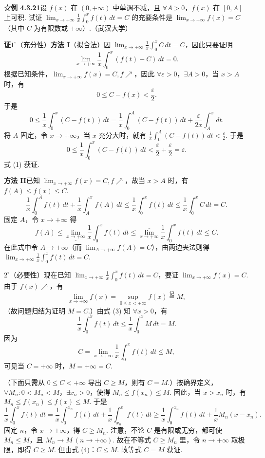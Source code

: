 \documentclass[UTF8, 12pt, fontset=fandol, oneside]{ctexart}
\begin{document}
\noindent\textbf{☆例 4.3.21}\quad 设 $f(x)$ 在 $(0,+\infty)$ 中单调不减，且 $\forall A>0$，$f(x)$ 在 $[0,A]$ 上可积. 试证 $\lim_{x\to+\infty}\frac1x\int_0^x f(t)\,dt=C$ 的充要条件是 $\lim_{x\to+\infty}f(x)=C$（其中 $C$ 为有限数或 $+\infty$）.（武汉大学）

\noindent\textbf{证}\quad $1^\circ$（充分性）\textbf{方法 I}（拟合法）\quad 因 $\lim_{x\to+\infty}\frac1x\int_0^x C\,dt=C$，因此只要证明
\[
\lim_{x\to+\infty}\frac1x\int_0^x(f(t)-C)\,dt=0.
\tag{1}
\]
根据已知条件，$\lim_{x\to+\infty}f(x)=C,f\nearrow$，因此 $\forall\varepsilon>0$，$\exists A>0$，当 $x>A$ 时，有
\[
0\le C-f(x)<\frac{\varepsilon}{2}.
\]
于是
\[
0\le\frac1x\int_0^x(C-f(t))\,dt
=\frac1x\int_0^A(C-f(t))\,dt+\frac{\varepsilon}{2x}\int_A^x dt.
\]
将 $A$ 固定，令 $x\to+\infty$，当 $x$ 充分大时，就有 $\frac1x\int_0^A(C-f(t))\,dt<\frac{\varepsilon}{2}$. 于是
\[
0\le\frac1x\int_0^x(C-f(t))\,dt
<\frac{\varepsilon}{2}+\frac{\varepsilon}{2}=\varepsilon.
\]
式 (1) 获证.

\noindent\textbf{方法 II}\quad 已知 $\lim_{x\to+\infty}f(x)=C,f\nearrow$，故当 $x>A$ 时，有 $f(A)\le f(x)\le C$.
\[
\frac1x\int_0^A f(t)\,dt+\frac1x\int_A^x f(A)\,dt
\le\frac1x\int_0^x f(t)\,dt
\le\frac1x\int_0^x C\,dt=C.
\tag{2}
\]
固定 $A$，令 $x\to+\infty$ 得
\[
f(A)\le\underline{\lim_{x\to+\infty}}\frac1x\int_0^x f(t)\,dt
\le\overline{\lim_{x\to+\infty}}\frac1x\int_0^x f(t)\,dt
\le C.
\]
在此式中令 $A\to+\infty$（而 $\lim_{A\to+\infty}f(A)=C$），由两边夹法则得 $\lim_{x\to+\infty}\frac1x\int_0^x f(t)\,dt=C$.

\noindent $2^\circ$（必要性）现在已知 $\lim_{x\to+\infty}\frac1x\int_0^x f(t)\,dt=C$，要证 $\lim_{x\to+\infty}f(x)=C$. 由于 $f(x)\nearrow$，有
\[
\lim_{x\to+\infty}f(x)=\sup_{0\le x<+\infty} f(x)\stackrel{\text{记}}{=}M,
\tag{3}
\]
（故问题归结为证明 $M=C$.）由式 (3) 知 $\forall x>0$，有
\[
\frac1x\int_0^x f(t)\,dt\le\frac1x\int_0^x M\,dt=M.
\]
因为
\[
C=\lim_{x\to+\infty}\frac1x\int_0^x f(t)\,dt\le M,
\tag{4}
\]
可见当 $C=+\infty$ 时，$M=+\infty=C$.

（下面只需从 $0\le C<+\infty$ 导出 $C\ge M$，则有 $C=M$.）按确界定义，$\forall M_n:0<M_n<M$，$\exists x_n>0$，使得 $M_n\le f(x_n)\le M$. 因此，当 $x>x_n$ 时，有 $M_n\le f(x_n)\le f(x)\le M$. 于是
\[
\frac1x\int_0^x f(t)\,dt
=\frac1x\int_0^{x_n} f(t)\,dt+\frac1x\int_{x_n}^x f(t)\,dt
\ge\frac1x\int_0^{x_n} f(t)\,dt+\frac1x M_n(x-x_n).
\]
固定 $n$，令 $x\to+\infty$，得 $C\ge M_n$. 注意，不论 $C$ 是有限或无穷，都可使 $M_n\le M$，且 $M_n\to M\ (n\to+\infty)$. 故在不等式 $C\ge M_n$ 里，令 $n\to+\infty$ 取极限，即得 $C\ge M$. 但由式 (4)：$C\le M$. 故等式 $C=M$ 获证.
\end{document}

